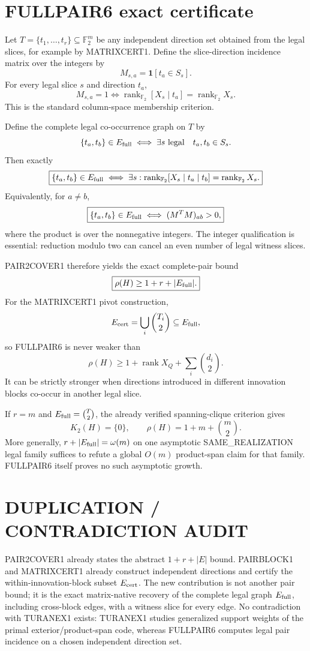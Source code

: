 \documentclass[11pt]{article}
\begin{document}
\section*{FULLPAIR6 exact certificate}
Let \(T=\{t_1,\ldots,t_r\}\subseteq\mathbb F_2^m\) be any independent direction set obtained from the legal slices, for example by MATRIXCERT1. Define the slice-direction incidence matrix over the integers by
\[
M_{s,a}=\mathbf 1[t_a\in S_s].
\]
For every legal slice \(s\) and direction \(t_a\),
\[
\boxed{
M_{s,a}=1
\iff
\operatorname{rank}_{\mathbb F_2}[X_s\mid t_a]
=
\operatorname{rank}_{\mathbb F_2}X_s .
}
\]
This is the standard column-space membership criterion.

Define the complete legal co-occurrence graph on \(T\) by
\[
\{t_a,t_b\}\in E_{\rm full}
\iff
\exists s\ {\rm legal}\quad t_a,t_b\in S_s.
\]
Then exactly
\[
\boxed{
\{t_a,t_b\}\in E_{\rm full}
\iff
\exists s:
\operatorname{rank}_{\mathbb F_2}[X_s\mid t_a\mid t_b]
=
\operatorname{rank}_{\mathbb F_2}X_s .
}
\]
Equivalently, for \(a\ne b\),
\[
\boxed{
\{t_a,t_b\}\in E_{\rm full}
\iff
(M^TM)_{ab}>0,
}
\]
where the product is over the nonnegative integers. The integer qualification is essential: reduction modulo two can cancel an even number of legal witness slices.

PAIR2COVER1 therefore yields the exact complete-pair bound
\[
\boxed{\rho(H)\ge 1+r+|E_{\rm full}|.}
\]
For the MATRIXCERT1 pivot construction,
\[
E_{\rm cert}=\bigcup_i\binom{T_i}{2}\subseteq E_{\rm full},
\]
so FULLPAIR6 is never weaker than
\[
\rho(H)\ge1+\operatorname{rank}X_Q+\sum_i\binom{d_i}{2}.
\]
It can be strictly stronger when directions introduced in different innovation blocks co-occur in another legal slice.

If \(r=m\) and \(E_{\rm full}=\binom{T}{2}\), the already verified spanning-clique criterion gives
\[
K_2(H)=\{0\},\qquad \rho(H)=1+m+\binom m2.
\]
More generally, \(r+|E_{\rm full}|=\omega(m)\) on one asymptotic SAME\_REALIZATION legal family suffices to refute a global \(O(m)\) product-span claim for that family. FULLPAIR6 itself proves no such asymptotic growth.

\section*{DUPLICATION / CONTRADICTION AUDIT}
PAIR2COVER1 already states the abstract \(1+r+|E|\) bound. PAIRBLOCK1 and MATRIXCERT1 already construct independent directions and certify the within-innovation-block subset \(E_{\rm cert}\). The new contribution is not another pair bound; it is the exact matrix-native recovery of the complete legal graph \(E_{\rm full}\), including cross-block edges, with a witness slice for every edge. No contradiction with TURANEX1 exists: TURANEX1 studies generalized support weights of the primal exterior/product-span code, whereas FULLPAIR6 computes legal pair incidence on a chosen independent direction set.
\end{document}
